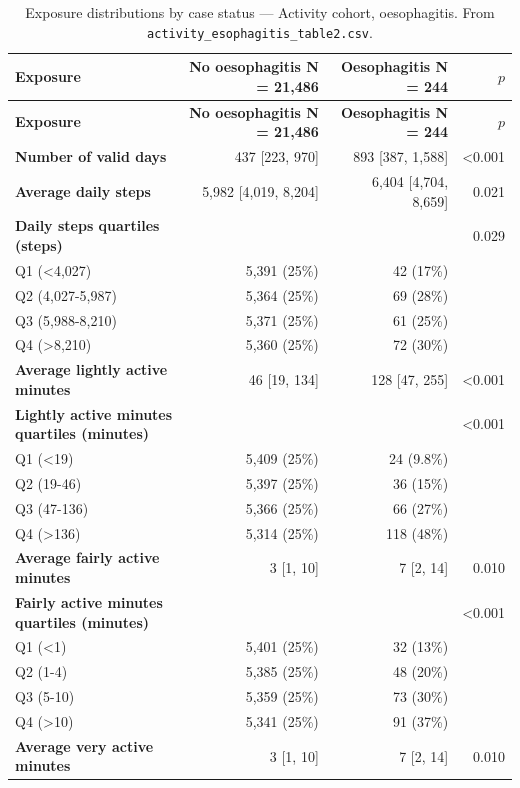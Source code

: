 \documentclass[11pt]{article}
\newcommand{\code}[1]{\texttt{\small #1}}
\begin{document}
\footnotesize\begin{longtable}{@{}p{6.4cm}rrr@{}}
\caption{Exposure distributions by case status --- Activity cohort, oesophagitis. From \code{activity\_esophagitis\_table2.csv}.}\label{tab:appM-t2-activity-esophagitis}\\
\toprule \textbf{Exposure} & \textbf{No oesophagitis     N = 21,486} & \textbf{Oesophagitis     N = 244} & \textbf{$p$} \\ \midrule \endfirsthead
\toprule \textbf{Exposure} & \textbf{No oesophagitis     N = 21,486} & \textbf{Oesophagitis     N = 244} & \textbf{$p$} \\ \midrule \endhead
\textbf{Number of valid days} & 437 [223, 970] & 893 [387, 1,588] & <0.001 \\
\textbf{Average daily steps} & 5,982 [4,019, 8,204] & 6,404 [4,704, 8,659] & 0.021 \\
\textbf{Daily steps quartiles (steps)} &  &  & 0.029 \\
\quad Q1 (<4,027) & 5,391 (25\%) & 42 (17\%) &  \\
\quad Q2 (4,027-5,987) & 5,364 (25\%) & 69 (28\%) &  \\
\quad Q3 (5,988-8,210) & 5,371 (25\%) & 61 (25\%) &  \\
\quad Q4 (>8,210) & 5,360 (25\%) & 72 (30\%) &  \\
\textbf{Average lightly active minutes} & 46 [19, 134] & 128 [47, 255] & <0.001 \\
\textbf{Lightly active minutes quartiles (minutes)} &  &  & <0.001 \\
\quad Q1 (<19) & 5,409 (25\%) & 24 (9.8\%) &  \\
\quad Q2 (19-46) & 5,397 (25\%) & 36 (15\%) &  \\
\quad Q3 (47-136) & 5,366 (25\%) & 66 (27\%) &  \\
\quad Q4 (>136) & 5,314 (25\%) & 118 (48\%) &  \\
\textbf{Average fairly active minutes} & 3 [1, 10] & 7 [2, 14] & 0.010 \\
\textbf{Fairly active minutes quartiles (minutes)} &  &  & <0.001 \\
\quad Q1 (<1) & 5,401 (25\%) & 32 (13\%) &  \\
\quad Q2 (1-4) & 5,385 (25\%) & 48 (20\%) &  \\
\quad Q3 (5-10) & 5,359 (25\%) & 73 (30\%) &  \\
\quad Q4 (>10) & 5,341 (25\%) & 91 (37\%) &  \\
\textbf{Average very active minutes} & 3 [1, 10] & 7 [2, 14] & 0.010 \\

\end{longtable}
\end{document}
